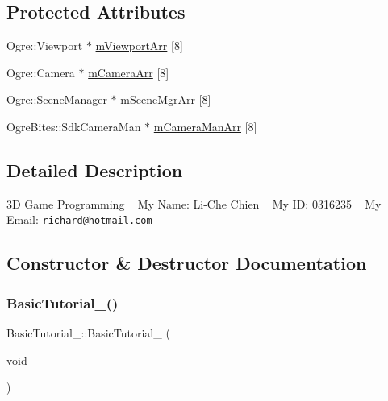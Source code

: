 \subsection*{Protected Attributes}
\begin{DoxyCompactItemize}
\item 
Ogre\+::\+Viewport $\ast$ \hyperlink{class_basic_tutorial__00_a6676a92b50e9b43634d4c66488537b73}{m\+Viewport\+Arr} \mbox{[}8\mbox{]}
\item 
Ogre\+::\+Camera $\ast$ \hyperlink{class_basic_tutorial__00_af8d457d912286a98c0975c52d4faf910}{m\+Camera\+Arr} \mbox{[}8\mbox{]}
\item 
Ogre\+::\+Scene\+Manager $\ast$ \hyperlink{class_basic_tutorial__00_a603779b6087698c57b7989e16d8a9b93}{m\+Scene\+Mgr\+Arr} \mbox{[}8\mbox{]}
\item 
Ogre\+Bites\+::\+Sdk\+Camera\+Man $\ast$ \hyperlink{class_basic_tutorial__00_a700c07f924c71e9fa1885a46f599d934}{m\+Camera\+Man\+Arr} \mbox{[}8\mbox{]}
\end{DoxyCompactItemize}


\subsection{Detailed Description}
3D Game Programming ~\newline
My Name\+: Li-\/\+Che Chien ~\newline
My ID\+: 0316235 ~\newline
My Email\+: \href{mailto:richard@hotmail.com}{\tt richard@hotmail.\+com} 

\subsection{Constructor \& Destructor Documentation}
\mbox{\label{class_basic_tutorial__00_a6b55068822076b28e7819b1878e95684}} 
\subsubsection{\texorpdfstring{Basic\+Tutorial\+\_()}{BasicTutorial\_00()}}
{\footnotesize\ttfamily Basic\+Tutorial\+\_\+::\+Basic\+Tutorial\+\_ (\begin{DoxyParamCaption}\item[{void}]{ }\end{DoxyParamCaption})}


